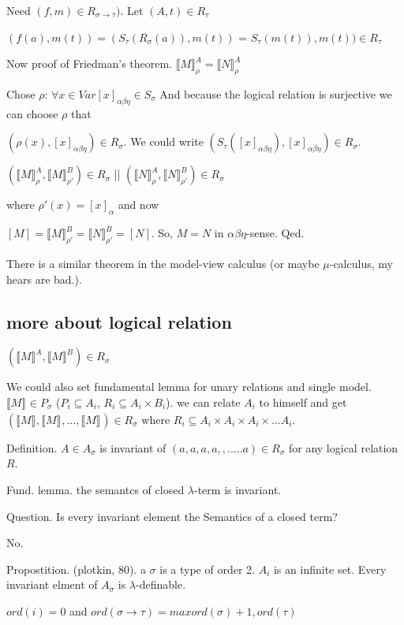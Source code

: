 \documentclass[a4paper,10pt]{book}
\newcommand{\sem}[2]{ \llbracket#1\rrbracket_{#2} }
\begin{document}

Need $(f,m) \in R_{\sigma \rightarrow \tau})$. Let $(A,t) \in R_\tau$

$(f(a), m(t)) = (S_\tau(R_\sigma(a)), m(t))$ = $S_\tau(m(t)), m(t)) \in R_\tau$

Now proof of Friedman's theorem.
$\sem{M}{\rho}^A = \sem{N}{\rho}^A$

Chose $\rho$: $\forall x \in Var      [x]_{\alpha\beta\eta} \in S_\sigma$
And because the logical relation is surjective  we can choose $\rho$ that

$(\rho(x), [x]_{\alpha\beta\eta}) \in R_\sigma$. We could write
$(S_\tau([x]_{\alpha\beta\eta}), [x]_{\alpha\beta\eta}) \in R_\sigma$.


$( \sem{M}{\rho}^A, \sem{M}{\rho'}^B ) \in R_\sigma$
     ||
$( \sem{N}{\rho}^A, \sem{N}{\rho'}^B ) \in R_\sigma$     

where $\rho'(x) = [x]_{\alpha}$ and now

$[M] = \sem{M}{\rho'}^B = \sem{N}{\rho'}^B = [N]$. So, $M=N$ in $\alpha\beta\eta$-sense. Qed.

There is a similar theorem in the model-view calculus (or maybe $\mu$-calculus, my hears are bad.).


\subsection{more about logical relation}

$(\sem{M}{}^A, \sem{M}{}^B) \in R_\sigma$

We could also set fundamental lemma for unary relations and single model.
$\sem{M}{} \in P_\sigma$ ($P_i \subseteq A_i$, $R_i \subseteq A_i \times B_i$). we can relate $A_i$ to himself
and get $(\sem{M}{}, \sem{M}{}, ..., \sem{M}{}) \in R_\sigma$ where $R_i \subseteq A_i \times A_i \times A_i \times ... A_i$.

Definition. $A\in A_\sigma$ is invariant of $(a,a,a,a,,.....a) \in R_\sigma$ for any logical relation $R$.

Fund. lemma. the semantcs of closed $\lambda$-term is invariant.

Question. Is every invariant element the Semantics of a closed term?   

No.

Propostition. (plotkin, 80). a $\sigma$ is a type of order 2. $A_i$ is an infinite set. Every invariant  
elment of $A_\sigma$ is $\lambda$-definable.

$ord(i) = 0$ and $ord(\sigma \rightarrow \tau) = max { ord(\sigma) + 1, ord(\tau)}$
\end{document}

